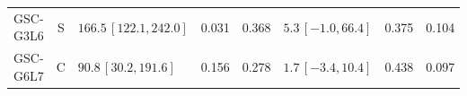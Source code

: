 \documentclass[10pt,a4paper]{article}
\begin{document}
\begin{longtable}{lcp{37mm}rrp{37mm}rr}
GSC-G3L6 & S & \(166.5\,[122.1,242.0]\) & 0.031 & 0.368 & \(5.3\,[-1.0,66.4]\) & 0.375 & 0.104\\
GSC-G6L7 & C & \(90.8\,[30.2,191.6]\) & 0.156 & 0.278 & \(1.7\,[-3.4,10.4]\) & 0.438 & 0.097\\

\end{longtable}
\end{document}
